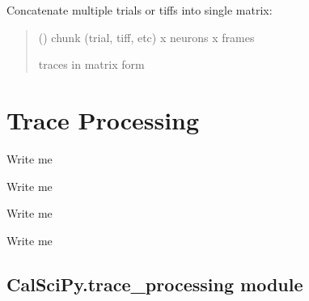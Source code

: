 \documentclass[letterpaper,10pt,english]{sphinxmanual}
\begin{document}
\begin{fulllineitems}
\label{\detokenize{CalSciPy.reorganization:CalSciPy.reorganization.merge_tensor}}
\pysigstartsignatures
{}
\pysigstopsignatures
\sphinxAtStartPar
Concatenate multiple trials or tiffs into single matrix:
\begin{quote}\begin{description}
\sphinxAtStartPar
{} () \textendash{} chunk (trial, tiff, etc) x neurons x frames

\sphinxAtStartPar
traces in matrix form

\sphinxAtStartPar
{}

\end{description}\end{quote}

\end{fulllineitems}



\section{Trace Processing}
\label{\detokenize{Sub-Packages:trace-processing}}\label{\detokenize{Sub-Packages:trace-processing-module}}
\begin{DUlineblock}{0em}
\item[] Write me
\item[] Write me
\item[] Write me
\item[] Write me
\end{DUlineblock}

\sphinxstepscope


\subsection{CalSciPy.trace\_processing module}
\label{\detokenize{CalSciPy.trace_processing:module-CalSciPy.trace_processing}}\label{\detokenize{CalSciPy.trace_processing:calscipy-trace-processing-module}}\label{\detokenize{CalSciPy.trace_processing::doc}}
\end{document}
